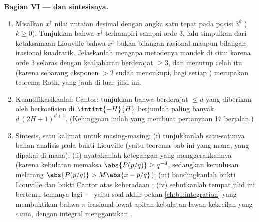\begin{problem}
\medskip
\noindent\textbf{Bagian VI ---  dan sintesisnya.}
\begin{enumerate}[resume]
  \item Misalkan $x^\dagger$ nilai untaian desimal dengan
        angka satu tepat pada posisi $3^k$ ($k \geq 0$). Tunjukkan bahwa
        $x^\dagger$ terhampiri sampai orde $3$, lalu simpulkan
        dari ketaksamaan Liouville bahwa $x^\dagger$ bukan
        bilangan rasional maupun bilangan irasional kuadratik. Jelaskanlah mengapa
        metodenya mandek di situ: karena orde $3$ selaras dengan
        kealjabaran berderajat $\geq 3$, dan menutup celah itu
        (karena sebarang eksponen $> 2$ sudah mencukupi, bagi setiap ) merupakan teorema Roth, yang jauh di luar jilid ini.
  \item Kuantifikasikanlah Cantor: tunjukkan bahwa 
        berderajat $\leq d$ yang diberikan oleh  berkoefisien
        di $\intint{-H}{H}$ berjumlah paling banyak $d\,(2H + 1)^{d+1}$.
        (Kehinggaan inilah yang membuat pertanyaan 17 berjalan.)
  \item Sintesis, satu kalimat untuk masing-masing: (i) tunjukkanlah satu-satunya
        bahan analisis pada bukti Liouville (yaitu teorema bab ini yang
        mana, yang dipakai di mana); (ii) nyatakanlah ketegangan
        yang menggerakkannya (karena kebulatan memaksa $\abs{P(p/q)} \geq
        q^{-d}$, sedangkan kemulusan melarang $\abs{P(p/q)} > M\abs{x -
        p/q}$); (iii) bandingkanlah bukti Liouville dan bukti Cantor
        atas keberadaan ; (iv) sebutkanlah
        tempat jilid ini bertemu temanya lagi --- yaitu soal akhir
        pekan \cref{ch:b1:integration} yang membuktikan bahwa $\pi$
        irasional lewat apitan kebulatan lawan kekecilan yang sama,
        dengan integral menggantikan .

\end{enumerate}
\end{problem}
